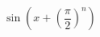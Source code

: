\documentclass{article}
\begin{document}
\[
	\sin\left(x+\left(\frac{\pi}{2}\right)^n\right)
\]
\end{document}
